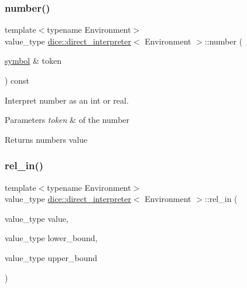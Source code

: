 \subsubsection{\texorpdfstring{number()}{number()}}
{\footnotesize\ttfamily template$<$typename Environment$>$ \\
value\+\_\+type \mbox{\hyperlink{classdice_1_1direct__interpreter}{dice\+::direct\+\_\+interpreter}}$<$ Environment $>$\+::number (\begin{DoxyParamCaption}\item[{\mbox{\hyperlink{structdice_1_1symbol}{symbol}} \&}]{token }\end{DoxyParamCaption}) const\hspace{0.3cm}{\ttfamily [inline]}}



Interpret number as an int or real. 


\begin{DoxyParams}{Parameters}
{\em token} & of the number\\
\hline
\end{DoxyParams}
\begin{DoxyReturn}{Returns}
number\textquotesingle{}s value 
\end{DoxyReturn}
\mbox{\label{classdice_1_1direct__interpreter_a4d0d65c115bd1775fc14be9106d6670b}} 
\subsubsection{\texorpdfstring{rel\+\_\+in()}{rel\_in()}}
{\footnotesize\ttfamily template$<$typename Environment$>$ \\
value\+\_\+type \mbox{\hyperlink{classdice_1_1direct__interpreter}{dice\+::direct\+\_\+interpreter}}$<$ Environment $>$\+::rel\+\_\+in (\begin{DoxyParamCaption}\item[{value\+\_\+type}]{value,  }\item[{value\+\_\+type}]{lower\+\_\+bound,  }\item[{value\+\_\+type}]{upper\+\_\+bound }\end{DoxyParamCaption})\hspace{0.3cm}{\ttfamily [inline]}}



